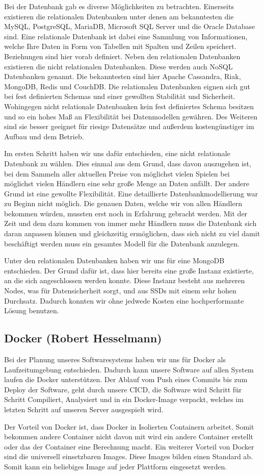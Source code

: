 Bei der Datenbank gab es diverse Möglichkeiten zu betrachten. Einerseits existieren die relationalen Datenbanken unter denen am bekanntesten die MySQL, PostgreSQL, MariaDB, Microsoft SQL Server und die Oracle Database sind. Eine relationale Datenbank ist dabei eine Sammlung von Informationen, welche Ihre Daten in Form von Tabellen mit Spalten und Zeilen speichert. Beziehungen sind hier vorab definiert. Neben den relationalen Datenbanken existieren die nicht relationalen Datenbanken. Diese werden auch NoSQL Datenbanken genannt. Die bekanntesten sind hier Apache Cassandra, Riak, MongoDB, Redis und CouchDB. Die relationalen Datenbanken eignen sich gut bei fest definierten Schemas und einer gewollten Stabilität und Sicherheit. Wohingegen nicht relationale Datenbanken kein fest definiertes Schema besitzen und so ein hohes Maß an Flexibilität bei Datenmodellen gewähren. Des Weiteren sind sie besser geeignet für riesige Datensätze und außerdem kostengünstiger im Aufbau und dem Betrieb. 

Im ersten Schritt haben wir uns dafür entschieden, eine nicht relationale Datenbank zu wählen. Dies einmal aus dem Grund, dass davon auszugehen ist, bei dem Sammeln aller aktuellen Preise von möglichst vielen Spielen bei möglichst vielen Händlern eine sehr große Menge an Daten anfällt. Der andere Grund ist eine gewollte Flexibilität. Eine detaillierte Datenbankmodellierung war zu Beginn nicht möglich. Die genauen Daten, welche wir von allen Händlern bekommen würden, mussten erst noch in Erfahrung gebracht werden. Mit der Zeit und dem dazu kommen von immer mehr Händlern muss die Datenbank sich daran anpassen können und gleichzeitig ermöglichen, dass sich nicht zu viel damit beschäftigt werden muss ein gesamtes Modell für die Datenbank anzulegen.

Unter den relationalen Datenbanken haben wir uns für eine MongoDB entschieden. Der Grund dafür ist, dass hier bereits eine große Instanz existierte, an die sich angeschlossen werden konnte. Diese Instanz besteht aus mehreren Nodes, was für Datensicherheit sorgt, und aus SSDs mit einem sehr hohen Durchsatz. Dadurch konnten wir ohne jedwede Kosten eine hochperformante Lösung benutzen.

\subsection*{Docker (Robert Hesselmann)}

Bei der Planung unseres Softwaresystems haben wir uns für Docker als Laufzeitumgebung entschieden. Dadurch kann unsere Software auf allen System laufen die Docker unterstützen. Der Ablauf vom Push eines Commits bis zum Deploy der Software, geht durch unsere \gls{CICD}, die Software wird Schritt für Schritt Compiliert, Analysiert und in ein Docker-Image verpackt, welches im letzten Schritt auf unseren Server ausgespielt wird.

Der Vorteil von Docker ist, dass Docker in Isolierten Containern arbeitet. Somit bekommen andere Container nicht davon mit wird ein andere Container erstellt oder das der Container eine Berechnung macht. Ein weiterer Vorteil von Docker sind die universell einsetzbaren Images. Diese Images bilden einen Standard ab. Somit kann ein beliebiges Image auf jeder Plattform eingesetzt werden.
